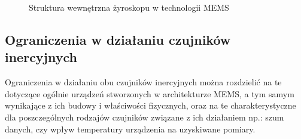 \begin{figure}[!htp]
	
	\caption{Struktura wewnętrzna żyroskopu w technologii MEMS}
	\label{fig:characteristics:imu:gyro:mems}
\end{figure}

\subsection{Ograniczenia w działaniu czujników inercyjnych}
Ograniczenia w działaniu obu czujników inercyjnych można rozdzielić na te dotyczące ogólnie urządzeń stworzonych w architekturze MEMS, a tym samym wynikające z ich budowy i właściwości fizycznych, oraz na te charakterystyczne dla poszczególnych rodzajów czujników związane z ich działaniem np.: szum danych, czy wpływ temperatury urządzenia na uzyskiwane pomiary.

